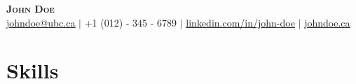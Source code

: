 \documentclass[letterpaper,11pt]{article}
\newcommand{\resumeItemListStart}{\begin{itemize}[leftmargin=*]}
\newcommand{\resumeItemListEnd}{\end{itemize}\vspace{-5pt}}
\newcommand\bbold[1]{\textcolor{primay}{\textbf{#1}}}
\newcommand\bunderline[1]{\textcolor{primay}{\underline{#1}}}
\begin{document}

\begin{center}
    \bbold{\LARGE \scshape John Doe} \\ \vspace{1pt}
    \href{mailto:johndoe@ubc.ca}{\bunderline{johndoe@ubc.ca}} $|$ \small +1 (012) - 345 - 6789 $|$ 
    \href{https://www.linkedin.com/in/john-doe/}{\bunderline{linkedin.com/in/john-doe}} $|$
    \href{https://johndoe.ca/}{\bunderline{johndoe.ca}}
\end{center}

\vspace{-0.75cm}

\section{Skills}

\end{document}
